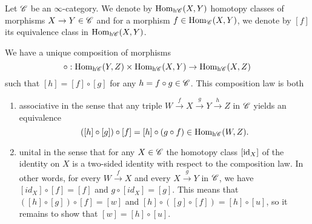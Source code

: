 \documentclass[../../thesis.tex]{subfiles}
\begin{document}
\begin{definition}\label{homhtpycat}
    Let $\mathscr{C}$ be an $\infty$-category.
    We denote by $\mathrm{Hom}_{\mathrm{h}\mathscr{C}}(X,Y)$ homotopy classes of morphisms $X\to Y \in \mathscr{C}$ and for a morphism $f \in \mathrm{Hom}_{\mathscr{C}}(X,Y)$, we denote by $[f]$ its equivalence class in $\mathrm{Hom}_{\mathrm{h}\mathscr{C}}(X,Y)$.
\end{definition}
\begin{proposition}
    We have a unique composition of morphisms
    \[
        \circ : \mathrm{Hom}_{\mathrm{h}\mathscr{C}}(Y, Z) \times \mathrm{Hom}_{\mathrm{h}\mathscr{C}}(X, Y) \rightarrow \mathrm{Hom}_{\mathrm{h}\mathscr{C}}(X, Z)
    \]
    such that $[h] = [f] \circ [g]$ for any $h = f\circ g \in \mathscr{C}$.
    This composition law is both
    \begin{enumerate}
        \item associative in the sense that any triple $W\xrightarrow{f}X\xrightarrow{g}Y\xrightarrow{h}Z$ in $\mathscr{C}$ yields an equivalence
              \[
                  ([h] \circ [g])\circ [f] = [h] \circ (g \circ f) \in \mathrm{Hom}_{\mathrm{h}\mathscr{C}}(W,Z).
              \]
        \item unital in the sense that for any $X\in \mathscr{C}$ the homotopy class $[\operatorname{id}_X]$ of the identity on $X$ is a two-sided identity with respect to the composition law.
              In other words, for every $W\xrightarrow{f}X$ and every $X\xrightarrow{g}Y$ in $\mathscr{C}$, we have $[id_X] \circ [f] = [f]$ and $g\circ [id_X] = [g]$.
              This means that $([h]\circ [g])\circ [f] = [w]$ and $[h] \circ ([g]\circ [f]) = [h]\circ [u]$, so it remains to show that $[w] = [h] \circ [u]$.
    \end{enumerate}
\end{proposition}
\end{document}
